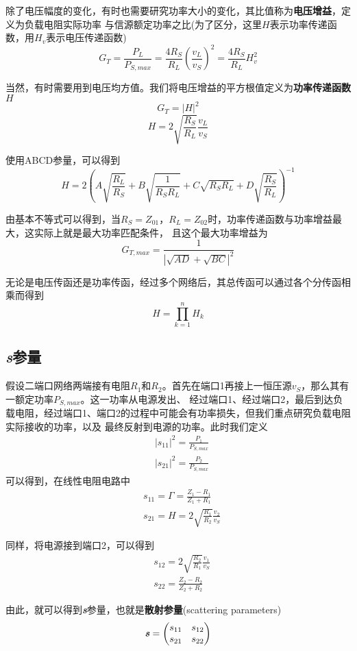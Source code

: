     \par 除了电压幅度的变化，有时也需要研究功率大小的变化，其比值称为\textbf{电压增益}，定义为负载电阻实际功率
    与信源额定功率之比(为了区分，这里$H$表示功率传递函数，用$H_v$表示电压传递函数)
    \[
    G_{T}=\frac{P_L}{P_{S,max}}=\frac{4R_S}{R_L}\left(\frac{v_{L}}{v_{S}}\right)^2=\frac{4R_S}{R_L}H_v^2    
    \]
    \par 当然，有时需要用到电压均方值。我们将电压增益的平方根值定义为\textbf{功率传递函数}$H$
    \[
        G_T=|H|^2
    \]
    \[
    H=2\sqrt{\frac{R_S}{R_L}}\frac{v_L}{v_S}    
    \]
    \par 使用ABCD参量，可以得到
    \[
    H=2\left(A\sqrt{\frac{R_L}{R_S}}+B\sqrt{\frac{1}{R_SR_L}}+C\sqrt{R_SR_L}+D\sqrt{\frac{R_S}{R_L}}\right)^{-1}    
    \]
    \par 由基本不等式可以得到，当$R_S=Z_{01}$，$R_L=Z_{02}$时，功率传递函数与功率增益最大，这实际上就是最大功率匹配条件，
    且这个最大功率增益为
    \[
    G_{T,max}=\frac{1}{|\sqrt{AD}+\sqrt{BC}|^2}    
    \]
    \par 无论是电压传函还是功率传函，经过多个网络后，其总传函可以通过各个分传函相乘而得到
    \[
    H=\prod_{k=1}^{n}H_{k}    
    \]

    \subsection{\textbf{\textit{s}}参量}
    \par 假设二端口网络两端接有电阻$R_1$和$R_2$。首先在端口1再接上一恒压源$v_S$，那么其有一额定功率$P_{S,max}$。这一功率从电源发出、
    经过端口1、经过端口2，最后到达负载电阻，经过端口1、端口2的过程中可能会有功率损失，但我们重点研究负载电阻实际接收的功率，以及
    最终反射到电源的功率。此时我们定义
    \begin{align*}
        &|s_{11}|^2=\frac{P_{1}}{P_{S,max}}\\
        &|s_{21}|^2=\frac{P_2}{P_{S,max}}
    \end{align*}
    可以得到，在线性电阻电路中
    \begin{align*}
        &s_{11}=\Gamma=\frac{Z_{1}-R_1}{Z_1+R_1}\\
        &s_{21}=H=2\sqrt{\frac{R_1}{R_2}}\frac{v_2}{v_S}
    \end{align*}
    \par 同样，将电源接到端口2，可以得到
    \begin{align*}
        &s_{12}=2\sqrt{\frac{R_2}{R_1}}\frac{v_1}{v_S}\\
        &s_{22}=\frac{Z_2-R_2}{Z_2+R_2}
    \end{align*}
    \par 由此，就可以得到\textbf{\textit{s}}参量，也就是\textbf{散射参量}(scattering parameters)
    \[
    \textbf{\textit{s}}=
    \begin{pmatrix}
        s_{11} & s_{12} \\ s_{21} & s_{22}
    \end{pmatrix}    
    \]

